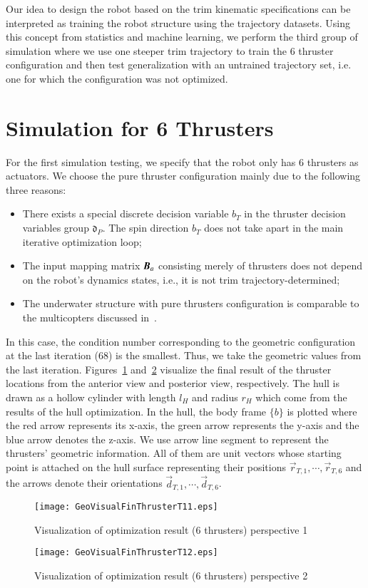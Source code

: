 Our idea to design the robot based on the trim kinematic specifications can be interpreted as training the robot structure using the trajectory datasets. Using this concept from statistics and machine learning, we perform the third group of simulation where we use one steeper trim trajectory to train the 6 thruster configuration and then test generalization with an untrained trajectory set, i.e. one for which the configuration was not optimized. 

\section{Simulation for 6 Thrusters}
For the first simulation testing, we specify that the robot only has 6 thrusters as actuators. We choose the pure thruster configuration mainly due to the following three reasons: 
\begin{itemize}
\item There exists a special discrete decision variable $b_{T}$ in the thruster decision variables group $\mathfrak{d}_{P}$. The spin direction $b_{T}$ does not take apart in the main iterative optimization loop;
\item The input mapping matrix $\emph{\textbf{B}}_{a}$ consisting merely of thrusters does not depend on the robot's dynamics states, i.e., it is not trim trajectory-determined;
\item The underwater structure with pure thrusters configuration is comparable to the multicopters discussed in~\cite{Du2016}.  
\end{itemize}

In this case, the condition number corresponding to the geometric configuration at
the last iteration (68) is the smallest. Thus, we take the geometric values from the last iteration. Figures~\ref{FIG:GeoVisualFinThrusterT11} and~\ref{FIG:GeoVisualFinThrusterT12} visualize the final result of the thruster locations from the anterior view and posterior view, respectively. The hull is drawn as a hollow cylinder with length $l_{H}$ and radius $r_{H}$ which come from the results of the hull optimization. In the hull, the body frame $\lbrace b \rbrace$ is plotted where the red arrow represents its x-axis, the green arrow represents the y-axis and the blue arrow denotes the z-axis. We use arrow line segment to represent the thrusters' geometric information. All of them are unit vectors whose starting point is attached on the hull surface representing their positions $\vec{r}_{T,1}, \cdots, \vec{r}_{T,6}$ and the arrows denote their orientations $\vec{d}_{T,1}, \cdots, \vec{d}_{T,6}$. 
\begin{figure}
\center
\texttt{[image: GeoVisualFinThrusterT11.eps]}
\caption{Visualization of optimization result (6 thrusters) perspective 1}	
\label{FIG:GeoVisualFinThrusterT11}
\end{figure}
\begin{figure}
\texttt{[image: GeoVisualFinThrusterT12.eps]}
\caption{Visualization of optimization result (6 thrusters) perspective 2}	
\label{FIG:GeoVisualFinThrusterT12}
\end{figure}

